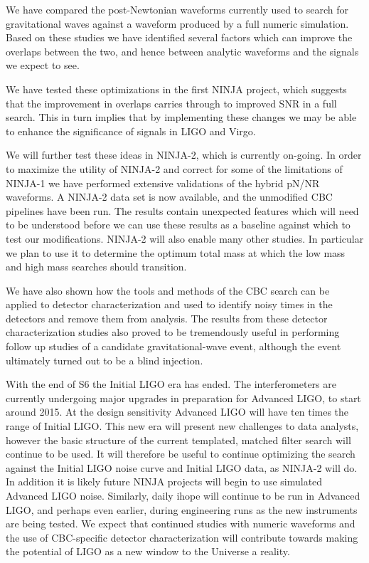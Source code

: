 We have compared the post-Newtonian waveforms currently used to
search for gravitational waves against a waveform produced by 
a full numeric simulation.  Based on these studies we have identified
several factors which can improve the overlaps between the two, and
hence between analytic waveforms and the signals we expect to see.

We have tested these optimizations in the first NINJA project, which
suggests that the improvement in overlaps carries through to improved
SNR in a full search.  This in turn implies that by implementing these
changes we may be able to enhance the significance of signals in LIGO
and Virgo.

We will further test these ideas in NINJA-2, which is currently
on-going.  In order to maximize the utility of NINJA-2 and correct
for some of the limitations of NINJA-1 we have performed extensive
validations of the hybrid pN/NR waveforms.  A NINJA-2 data set is now
available, and the unmodified CBC pipelines have been run.  The
results contain unexpected features which will need to be understood
before we can use these results as a baseline against which to test
our modifications.  NINJA-2 will also enable many other studies.  In
particular we plan to use it to determine the optimum total mass at
which the low mass and high mass searches should transition.

We have also shown how the tools and methods of the CBC search can be
applied to detector characterization and used to identify noisy times
in the detectors and remove them from analysis.  The results from
these detector characterization studies also proved to be tremendously
useful in performing follow up studies of a candidate
gravitational-wave event, although the event ultimately turned out to
be a blind injection.

With the end of S6 the Initial LIGO era has ended.  The
interferometers are currently undergoing major upgrades in preparation
for Advanced LIGO, to start around 2015.  At the design sensitivity
Advanced LIGO will have ten times the range of Initial LIGO.  This new
era will present new challenges to data analysts, however the basic
structure of the current templated, matched filter search will
continue to be used.   It will therefore be useful to continue
optimizing the search against the Initial LIGO noise curve and Initial
LIGO data, as NINJA-2 will do.  In addition it is likely future NINJA
projects will begin to use simulated Advanced LIGO noise.  Similarly,
daily ihope will continue to be run in Advanced LIGO, and perhaps even
earlier, during engineering runs as the new instruments are being
tested.  We expect that continued studies with numeric waveforms and
the use of CBC-specific detector characterization will contribute
towards making the potential of LIGO as a new window to the Universe a
reality.


